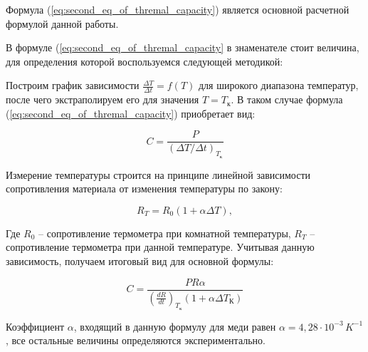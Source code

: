 \documentclass[a4paper, 12pt]{article}%
\begin{document}
	Формула (\ref{eq:second_eq_of_thremal_capacity}) является основной расчетной формулой данной работы.
	
	В формуле (\ref{eq:second_eq_of_thremal_capacity} в знаменателе стоит величина, для определения которой воспользуемся следующей методикой:
	
	Построим график зависимости $\frac{\Delta T}{\Delta t} = f \left( T \right)$ для широкого диапазона температур, после чего экстраполируем его для значения $T = T_{\text{к}}$. В таком случае формула (\ref{eq:second_eq_of_thremal_capacity}) приобретает вид:
	
	\begin{equation}
		C = \frac{P}{\left( \Delta T / \Delta t \right)_{T_{\text{к}}}}
		\label{eq:final_eq_for_capacity}
	\end{equation}
	
	Измерение температуры строится на принципе линейной зависимости сопротивления материала от изменения температуры по закону:
	
	\begin{equation}
		R_{T} = R_{0} \left( 1 + \alpha \Delta T \right),
	\end{equation}
	
	Где $R_{0}$ -- сопротивление термометра при комнатной температуры, $R_{T}$ -- сопротивление термометра при данной температуре. Учитывая данную зависимость, получаем итоговый вид для основной формулы:
	
	\begin{equation}
		C = \frac{PR\alpha}{\left( \frac{dR}{dt} \right)_{T_{\text{к}}}\left( 1 + \alpha \Delta T_{\text{К}} \right)}
		\label{eq:capacity}
	\end{equation}	 
	
	Коэффициент $\alpha$, входящий в данную формулу для меди равен $\alpha = 4,28 \cdot 10^{-3} \, K^{-1}$, все остальные величины определяются экспериментально.
\end{document}
